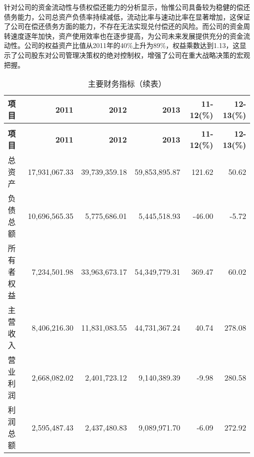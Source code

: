 针对公司的资金流动性与债权偿还能力的分析显示，怡惟公司具备较为稳健的偿还债务能力，公司总资产负债率持续减低，流动比率与速动比率在显著增加，这保证了公司在偿还债务方面的能力，不存在无法实现兑付偿还的风险。而公司的资金周转速度逐年加快，资产使用效率也在逐步提高，为公司未来发展提供充分的资金流动性。公司的权益资产比值从2011年的40\%上升为89\%，权益乘数达到1.13，这显示了公司股东对公司管理决策权的绝对控制权，增强了公司在重大战略决策的宏观把握。
\renewcommand*{\arraystretch}{0.8}
\setlength{\tabcolsep}{5pt}
\begin{longtable}{>{\footnotesize}l>{\footnotesize}r>{\footnotesize}r>{\footnotesize}r>{\footnotesize}r>{\footnotesize}r}
\caption[主要财务指标]{主要财务指标}\\  %
\hline\hline
\rowcolor{mycyan} {\bfseries \footnotesize  项目} & {\bfseries \footnotesize  2011}\hspace{2ex} & {\bfseries \footnotesize   2012}\hspace{2ex} &   {\bfseries \footnotesize   2013}\hspace{2ex}  &{\bfseries \footnotesize  11-12(\%)} &{\bfseries \footnotesize  12-13(\%)} \\  \endfirsthead          %
\caption[]{主要财务指标（续表）} \\ 
\hline\hline
\rowcolor{mycyan} {\bfseries \footnotesize  项目} & {\bfseries \footnotesize  2011}\hspace{2ex} & {\bfseries \footnotesize   2012}\hspace{2ex} &   {\bfseries \footnotesize   2013}\hspace{2ex}  &{\bfseries \footnotesize  11-12(\%)} &{\bfseries \footnotesize  12-13(\%)} \\ \endhead                %
\hline
\endfoot
\hline   %
总资产	&	17,931,067.33	&	39,739,359.18	&	59,853,895.87	&	121.62	&	50.62	\\
负债总额	&	10,696,565.35	&	5,775,686.01	&	5,445,518.93	&	-46.00	&	-5.72	\\
所有者权益	&	7,234,501.98	&	33,963,673.17	&	54,349,779.31	&	369.47	&	60.02	\\
\midrule
主营收入	&	8,406,216.30	&	11,831,083.55	&	44,731,367.24	&	40.74	&	278.08	\\
营业利润	&	2,668,082.02	&	2,401,723.12	&	9,140,389.39	&	-9.98	&	280.58	\\
利润总额	&	2,595,487.43	&	2,437,480.83	&	9,089,971.70	&	-6.09	&	272.92	\\

\end{longtable}
